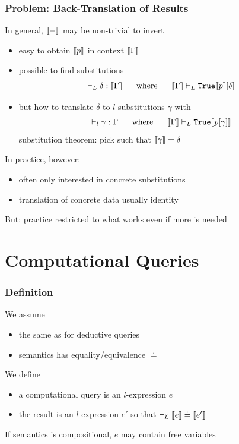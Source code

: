 \begin{frame}\frametitle{Problem: Back-Translation of Results}
In general, $\llbracket -\rrbracket$ may be non-trivial to invert
\begin{itemize}
\item easy to obtain $\llbracket p\rrbracket$ in context $\llbracket \Gamma\rrbracket$
\item possible to find substitutions
\[\vdash_L \delta:\llbracket \Gamma\rrbracket \hspace*{.5cm}\;\mathrm{where}\;\hspace*{.5cm} \llbracket \Gamma\rrbracket\vdash_L \mathtt{True} \llbracket p\rrbracket[\delta]\]
\item but how to translate $\delta$ to $l$-substitutions $\gamma$ with
 \[\vdash_l \gamma:\Gamma \hspace*{.5cm}\;\mathrm{where}\;\hspace*{.5cm} \llbracket \Gamma\rrbracket\vdash_L \mathtt{True} \llbracket p[\gamma]\rrbracket\]
 substitution theorem: pick such that $\llbracket \gamma\rrbracket=\delta$
\end{itemize}

In practice, however:
\begin{itemize}
\item often only interested in concrete substitutions
\item translation of concrete data usually identity
\end{itemize}
But: practice restricted to what works even if more is needed
\end{frame}


\section{Computational Queries}

\begin{frame}\frametitle{Definition}
We assume
\begin{itemize}
\item the same as for deductive queries
\item semantics has equality/equivalence $\doteq$
\end{itemize}

We define
\begin{itemize}
\item a computational query is an $l$-expression $e$
\item the result is an $l$-expression $e'$ so that $\vdash_L\llbracket e\rrbracket\doteq\llbracket e'\rrbracket$
\end{itemize}

If semantics is compositional, $e$ may contain free variables
\end{frame}

